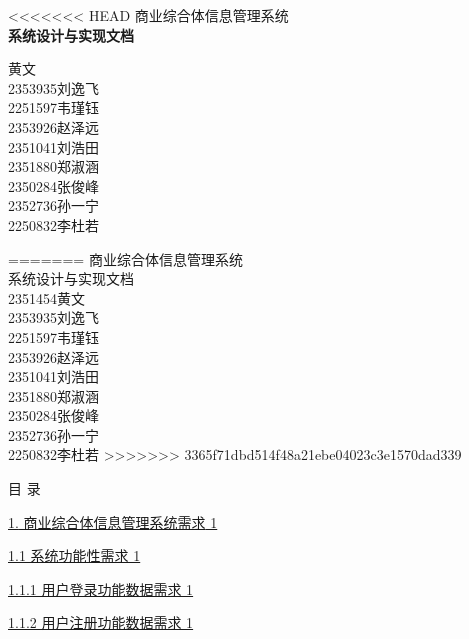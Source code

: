 \documentclass[]{article}
\date{}
\begin{document}
\begin{center}
<<<<<<< HEAD
\protect\hypertarget{_Hlk208135206}{}{}
{\fontsize{24}{30}\selectfont 商业综合体信息管理系统}\\[8pt]
{\fontsize{18}{28}\selectfont\textbf{系统设计与实现文档}}\\[12pt]
{\begin{spacing}{1.6}\fontsize{18}{28}\quad 黄文\\
2353935\quad 刘逸飞\\
2251597\quad 韦瑾钰\\
2353926\quad 赵泽远\\
2351041\quad 刘浩田\\
2351880\quad 郑淑涵\\
2350284\quad 张俊峰\\
2352736\quad 孙一宁\\
2250832\quad 李杜若
\end{spacing}}
=======
  \protect\hypertarget{_Hlk208135206}{}{}\LARGE 商业综合体信息管理系统\\[6pt]
  \large 系统设计与实现文档\\[12pt]
  \normalsize
  2351454\quad 黄文\\
  2353935\quad 刘逸飞\\
  2251597\quad 韦瑾钰\\
  2353926\quad 赵泽远\\
  2351041\quad 刘浩田\\
  2351880\quad 郑淑涵\\
  2350284\quad 张俊峰\\
  2352736\quad 孙一宁\\
  2250832\quad 李杜若
>>>>>>> 3365f71dbd514f48a21ebe04023c3e1570dad339
\end{center}

\newpage



\bigskip
目 录

\protect\hyperlink{_Toc77076512}{{1.} 商业综合体信息管理{系统需求} 1}

\protect\hyperlink{ux7cfbux7edfux529fux80fdux6027ux9700ux6c42}{1.1
  系统功能性需求 1}

\protect\hyperlink{ux7528ux6237ux767bux5f55ux529fux80fdux6570ux636eux9700ux6c42}{1.1.1
  用户登录功能数据需求 1}

\protect\hyperlink{ux7528ux6237ux6ce8ux518cux529fux80fdux6570ux636eux9700ux6c42}{1.1.2
  用户注册功能数据需求 1}
\end{document}
